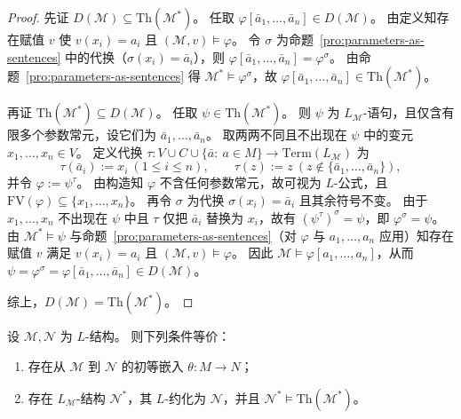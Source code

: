 \documentclass[lang=cn,a4paper,newtx,section]{elegantbook}
\begin{document}
\begin{proof}
先证 $D(\mathcal M)\subseteq\mathrm{Th}(\mathcal M^*)$。
任取 $\varphi[\bar a_1,\dots,\bar a_n]\in D(\mathcal M)$。
由定义知存在赋值 $v$ 使 $v(x_i)=a_i$ 且 $(\mathcal M,v)\models\varphi$。
令 $\sigma$ 为命题~\ref{pro:parameters-as-sentences} 中的代换（$\sigma(x_i)=\bar a_i$），则 $\varphi[\bar a_1,\dots,\bar a_n]=\varphi^{\sigma}$。
由命题~\ref{pro:parameters-as-sentences} 得 $\mathcal M^*\models\varphi^{\sigma}$，故 $\varphi[\bar a_1,\dots,\bar a_n]\in\mathrm{Th}(\mathcal M^*)$。

再证 $\mathrm{Th}(\mathcal M^*)\subseteq D(\mathcal M)$。
任取 $\psi\in\mathrm{Th}(\mathcal M^*)$。
则 $\psi$ 为 $L_{\mathcal M}$-语句，且仅含有限多个参数常元，设它们为 $\bar a_1,\dots,\bar a_n$。
取两两不同且不出现在 $\psi$ 中的变元 $x_1,\dots,x_n\in V$。
定义代换 $\tau:V\cup C\cup\{\bar a:\ a\in M\}\to\mathrm{Term}(L_{\mathcal M})$ 为
\[
  \tau(\bar a_i):=x_i\ (1\le i\le n),\qquad \tau(z):=z\ (z\notin\{\bar a_1,\dots,\bar a_n\}),
\]
并令 $\varphi:=\psi^{\tau}$。
由构造知 $\varphi$ 不含任何参数常元，故可视为 $L$-公式，且 $\mathrm{FV}(\varphi)\subseteq\{x_1,\dots,x_n\}$。
再令 $\sigma$ 为代换 $\sigma(x_i)=\bar a_i$ 且其余符号不变。
由于 $x_1,\dots,x_n$ 不出现在 $\psi$ 中且 $\tau$ 仅把 $\bar a_i$ 替换为 $x_i$，故有 $(\psi^{\tau})^{\sigma}=\psi$，即 $\varphi^{\sigma}=\psi$。
由 $\mathcal M^*\models\psi$ 与命题~\ref{pro:parameters-as-sentences}（对 $\varphi$ 与 $a_1,\dots,a_n$ 应用）知存在赋值 $v$ 满足 $v(x_i)=a_i$ 且 $(\mathcal M,v)\models\varphi$。
 因此 $\mathcal M\models\varphi[a_1,\dots,a_n]$，从而 $\psi=\varphi^{\sigma}=\varphi[\bar a_1,\dots,\bar a_n]\in D(\mathcal M)$。

 综上，$D(\mathcal M)=\mathrm{Th}(\mathcal M^*)$。
 \end{proof}

\begin{lemma}
\label{elementary-embedding-via-diagram}
设 $\mathcal M,\mathcal N$ 为 $L$-结构。
则下列条件等价：
\begin{enumerate}
  \item 存在从 $\mathcal M$ 到 $\mathcal N$ 的初等嵌入 $\theta:M\to N$；
  \item 存在 $L_{\mathcal M}$-结构 $\mathcal N^*$，其 $L$-约化为 $\mathcal N$，并且 $\mathcal N^*\models\mathrm{Th}(\mathcal M^*)$。
\end{enumerate}
\end{lemma}
\end{document}
